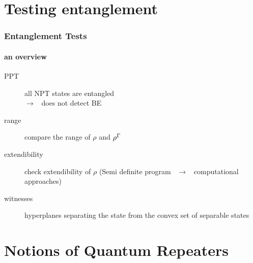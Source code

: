 \documentclass[compress,notes=hide]{beamer}
\begin{document}
\section[Detection]{Testing entanglement}

\begin{frame}
\frametitle{Entanglement Tests}
\framesubtitle{an overview}

\begin{description}
  \item[PPT] all NPT states are entangled
    \\ $\rightarrow$ \ does not detect BE
  \item[range] compare the range of $\rho$ and $\rho^{\Gamma}$
  \item[extendibility] check extendibility of $\rho$ \cite{paper:extensions} (Semi definite program \ $\rightarrow$ \ computational approaches)
  \item[witnesses] hyperplanes separating the state from the convex set of separable states \cite{EntWitness_Terhal}
\end{description}


\end{frame}


\section[Quant Repeaters]{Notions of Quantum Repeaters}

\begin{frame}
	\tableofcontents[currentsection,subsectionstyle=show/show/hide,subsubsectionstyle=show/show/hide]
\end{frame}
\end{document}
